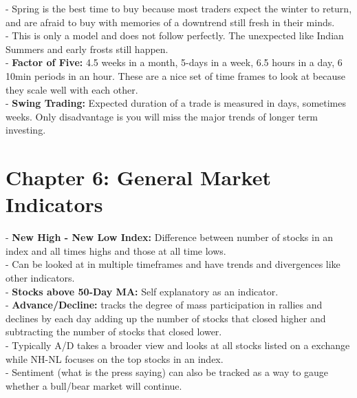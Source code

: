 \documentclass[12pt,fullpage]{article}
\begin{document}
- Spring is the best time to buy because most traders expect the winter to return, and are afraid to buy with memories of a downtrend still fresh in their minds.\\
- This is only a model and does not follow perfectly. The unexpected like Indian Summers and early frosts still happen.\\
- \textbf{Factor of Five:} 4.5 weeks in a month, 5-days in a week, 6.5 hours in a day, 6 10min periods in an hour. These are a nice set of time frames to look at because they scale well with each other.\\
- \textbf{Swing Trading:} Expected duration of a trade is measured in days, sometimes weeks. Only disadvantage is you will miss the major trends of longer term investing.
\section*{Chapter 6: General Market Indicators}
- \textbf{New High - New Low Index:} Difference between number of stocks in an index and all times highs and those at all time lows.\\
- Can be looked at in multiple timeframes and have trends and divergences like other indicators.\\
- \textbf{Stocks above 50-Day MA:} Self explanatory as an indicator.\\
- \textbf{Advance/Decline:} tracks the degree of mass participation in rallies and declines by each day adding up the number of stocks that closed higher and subtracting the number of stocks that closed lower.\\
- Typically A/D takes a broader view and looks at all stocks listed on a exchange while NH-NL focuses on the top stocks in an index.\\
- Sentiment (what is the press saying) can also be tracked as a way to gauge whether a bull/bear market will continue.
\end{document}
